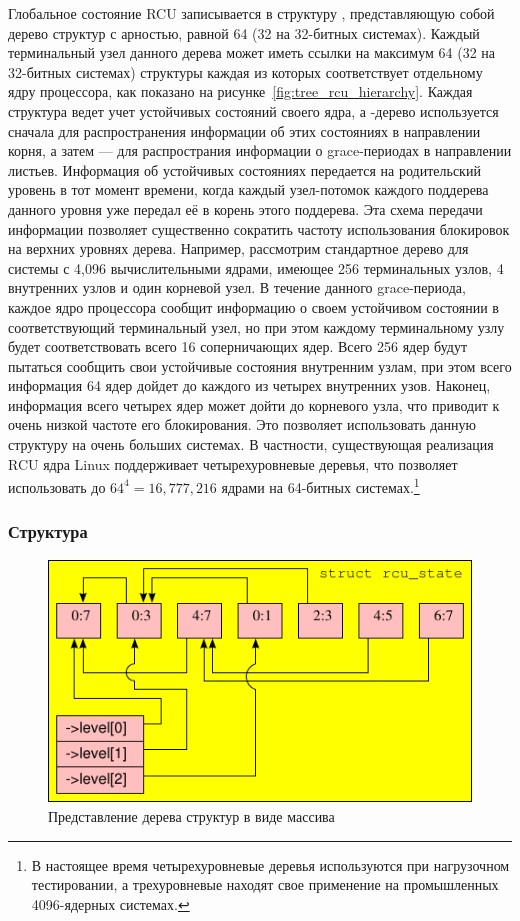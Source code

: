 Глобальное состояние RCU записывается в структуру ,
представляющую собой дерево структур  с арностью, равной 64
(32 на 32-битных системах). Каждый терминальный узел данного дерева
может иметь ссылки на максимум 64 (32 на 32-битных системах) структуры
 каждая из которых соответствует отдельному ядру процессора,
как показано на рисунке~\ref{fig:tree_rcu_hierarchy}.
Каждая структура  ведет учет устойчивых состояний своего ядра,
а -дерево используется сначала для распространения информации
об этих состояниях в направлении корня,
а затем --- для распространия информации о grace-периодах в направлении листьев.
Информация об устойчивых состояниях передается на родительский уровень
в тот момент времени, когда каждый узел-потомок каждого поддерева данного уровня
уже передал её в корень этого поддерева.
Эта схема передачи информации позволяет существенно сократить частоту использования
блокировок на верхних уровнях дерева.
Например, рассмотрим стандартное  дерево для системы с
4{,}096 вычислительными ядрами, имеющее 256 терминальных узлов,
4 внутренних узлов и один корневой узел. В течение данного grace-периода,
каждое ядро процессора сообщит информацию о своем устойчивом состоянии в
соответствующий терминальный узел, но при этом каждому терминальному узлу
будет соответствовать всего 16 соперничающих ядер.
Всего 256 ядер будут пытаться сообщить свои устойчивые состояния внутренним узлам,
при этом всего информация 64 ядер дойдет до каждого из четырех внутренних узов.
Наконец, информация всего четырех ядер может дойти до корневого узла,
что приводит к очень низкой частоте его блокирования.
Это позволяет использовать данную структуру на очень больших системах.
В частности, существующая реализация RCU ядра Linux поддерживает
четырехуровневые деревья, что позволяет использовать до
$64^4 = 16{,}777{,}216$ ядрами на 64-битных системах.\footnote{
  В настоящее время четырехуровневые деревья используются при нагрузочном тестировании,
  а трехуровневые находят свое применение на промышленных 4096-ядерных системах.}

\subsubsection{Структура }

\begin{figure}[tbp]
\centering
\includegraphics[scale=0.9]{rcu_node_array.pdf}
\caption{Представление дерева структур  в виде массива}
\label{fig:rcu_node_array}
\end{figure}

